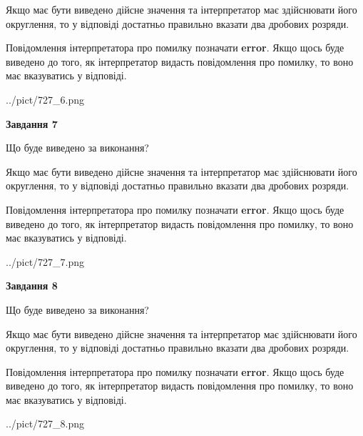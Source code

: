 \documentclass[12pt, ukrainian]{article}
\begin{document}
{\begin {Large}
Якщо має бути виведено дійсне значення та інтерпретатор має здійснювати його округлення, 
то у відповіді достатньо правильно вказати два дробових розряди.

Повідомлення інтерпретатора про помилку позначати \textbf{error}.
Якщо щось буде виведено до того, як інтерпретатор видасть повідомлення про помилку, 
то воно має вказуватись у відповіді. \par

\begin{center}
	{../pict/727_6.png}
\end{center}
\newpage

{\begin {center}\textbf{Завдання 7}\end {center}}\par
Що буде виведено за виконання? \par

Якщо має бути виведено дійсне значення та інтерпретатор має здійснювати його округлення, 
то у відповіді достатньо правильно вказати два дробових розряди.

Повідомлення інтерпретатора про помилку позначати \textbf{error}.
Якщо щось буде виведено до того, як інтерпретатор видасть повідомлення про помилку, 
то воно має вказуватись у відповіді. \par

\begin{center}
	{../pict/727_7.png}
\end{center}
\newpage

{\begin {center}\textbf{Завдання 8}\end {center}}\par
Що буде виведено за виконання? \par

Якщо має бути виведено дійсне значення та інтерпретатор має здійснювати його округлення, 
то у відповіді достатньо правильно вказати два дробових розряди.

Повідомлення інтерпретатора про помилку позначати \textbf{error}.
Якщо щось буде виведено до того, як інтерпретатор видасть повідомлення про помилку, 
то воно має вказуватись у відповіді. \par

\begin{center}
	{../pict/727_8.png}
\end{center}
\newpage


\end{Large}}
\end{document}
